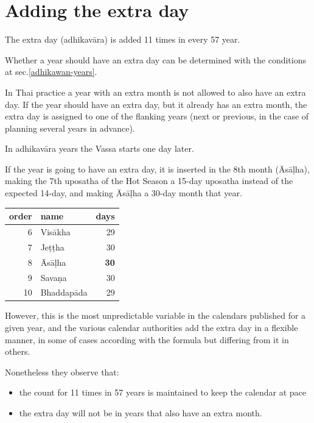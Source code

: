 \documentclass[11pt,oneside]{memoir-article}
\begin{document}
\section{Adding the extra day}
\label{sec-2-2}
\label{adding-extra-day}

The extra day (adhikavāra) is added 11 times in every 57 year.

Whether a year should have an extra day can be determined with the
conditions at sec.\ref{adhikawan-years}.

In Thai practice a year with an extra month is not allowed to also
have an extra day. If the year should have an extra day, but it
already has an extra month, the extra day is assigned to one of the
flanking years (next or previous, in the case of planning several
years in advance).

In adhikavāra years the Vassa starts one day later.

If the year is going to have an extra day, it is inserted in the 8th month
(Āsāḷha), making the 7th uposatha of the Hot Season a 15-day uposatha instead of
the expected 14-day, and making Āsāḷha a 30-day month that
year.\cite{hasapannyo-zodiac}

\begin{center}
\begin{tabular}{rlr}
order & name & days\\
\hline
6 & Visākha & 29\\
7 & Jeṭṭha & 30\\
8 & Āsāḷha & \textbf{30}\\
9 & Savaṇa & 30\\
10 & Bhaddapāda & 29\\
\end{tabular}
\end{center}

However, this is the most unpredictable variable in the calendars
published for a given year, and the various calendar authorities add
the extra day in a flexible manner, in some of cases according with
the formula but differing from it in others.

Nonetheless they observe that:

\begin{itemize}
\item the count for 11 times in 57 years is maintained to keep the
calendar at pace
\item the extra day will not be in years that also have an extra month.
\end{itemize}
\end{document}

